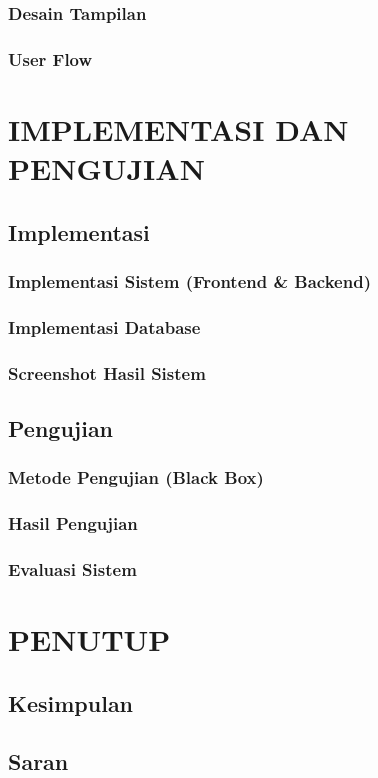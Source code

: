 \documentclass[12pt,a4paper,twoside]{report}
\begin{document}
\subsection{Desain Tampilan}
\subsection{User Flow}

\chapter{IMPLEMENTASI DAN PENGUJIAN}

\section{Implementasi}

\subsection{Implementasi Sistem (Frontend \& Backend)}
\subsection{Implementasi Database}
\subsection{Screenshot Hasil Sistem}

\section{Pengujian}

\subsection{Metode Pengujian (Black Box)}
\subsection{Hasil Pengujian}
\subsection{Evaluasi Sistem}

\chapter{PENUTUP}

\section{Kesimpulan}

\section{Saran}

\printbibliography[heading=bibintoc, title={Daftar Pustaka}]
\end{document}
